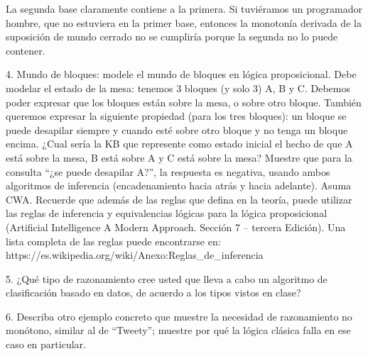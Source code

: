 La segunda base claramente contiene a la primera. Si tuviéramos un programador hombre, que no estuviera en la primer base, entonces la monotonía derivada de la suposición de mundo cerrado no se cumpliría porque la segunda no lo puede contener.


4. Mundo de bloques: modele el mundo de bloques en lógica proposicional. Debe modelar el estado de la mesa: tenemos 3 bloques (y solo 3) A, B y C. Debemos poder expresar que los bloques están sobre la mesa, o sobre otro bloque. También queremos expresar la siguiente propiedad (para los tres bloques): un bloque se puede desapilar siempre y cuando esté sobre otro bloque y no tenga un bloque encima. ¿Cual sería la KB que represente como estado inicial el hecho de que A está sobre la mesa, B está sobre A y C está sobre la mesa? Muestre que para la consulta “¿se puede desapilar A?”, la respuesta es negativa, usando ambos algoritmos de inferencia (encadenamiento hacia atrás y hacia adelante). Asuma CWA. Recuerde que además de las reglas que defina en la teoría, puede utilizar las reglas de inferencia y equivalencias lógicas para la lógica proposicional (Artificial Intelligence A Modern Approach. Sección 7 – tercera Edición). Una lista completa de las reglas puede encontrarse en: https://es.wikipedia.org/wiki/Anexo:Reglas_de_inferencia

5. ¿Qué tipo de razonamiento cree usted que lleva a cabo un algoritmo de clasificación basado en datos, de acuerdo a los tipos vistos en clase?

6. Describa otro ejemplo concreto que muestre la necesidad de razonamiento no monótono, similar al de “Tweety”; muestre por qué la lógica clásica falla en ese caso en particular.


\bigskip